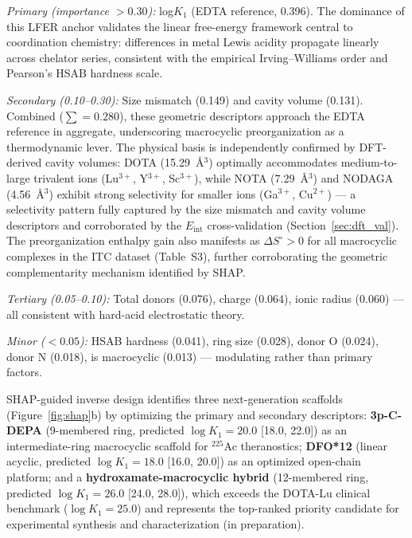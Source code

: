 \documentclass[journal=jacsat,manuscript=article]{achemso}
\begin{document}
\textit{Primary (importance $> 0.30$):} log$K_1$ (EDTA reference, 0.396).
The dominance of this LFER anchor validates the linear free-energy framework
central to coordination chemistry:\cite{Hancock1989,MartellSmith2004}
differences in metal Lewis acidity propagate linearly across chelator series,
consistent with the empirical Irving--Williams order and Pearson's HSAB
hardness scale.\cite{Pearson1963,Parr1983}

\textit{Secondary (0.10--0.30):} Size mismatch (0.149) and cavity volume (0.131).
Combined ($\sum = 0.280$), these geometric descriptors approach the EDTA
reference in aggregate, underscoring macrocyclic preorganization as a thermodynamic
lever.\cite{RocaSabio2009,Baranyai2007,Simecek2012}
The physical basis is independently confirmed by DFT-derived cavity
volumes:\cite{Kim2026molpharm} DOTA (15.29~\AA$^3$) optimally accommodates
medium-to-large trivalent ions (Lu$^{3+}$, Y$^{3+}$, Sc$^{3+}$), while NOTA
(7.29~\AA$^3$) and NODAGA (4.56~\AA$^3$) exhibit strong selectivity for
smaller ions (Ga$^{3+}$, Cu$^{2+}$) --- a selectivity pattern fully captured
by the size mismatch and cavity volume descriptors and corroborated by the
$E_\mathrm{int}$ cross-validation (Section~\ref{sec:dft_val}).
The preorganization enthalpy gain also manifests as $\Delta S^\circ > 0$ for all
macrocyclic complexes in the ITC dataset (Table~S3),\cite{Leavitt2001,Blei2023}
further corroborating the geometric complementarity mechanism identified by SHAP.

\textit{Tertiary (0.05--0.10):} Total donors (0.076), charge (0.064),
ionic radius (0.060) --- all consistent with hard-acid electrostatic theory.\cite{Hancock1989,Shannon1976}

\textit{Minor ($< 0.05$):} HSAB hardness (0.041), ring size (0.028), donor O (0.024),
donor N (0.018), is macrocyclic (0.013) --- modulating rather than primary factors.

SHAP-guided inverse design identifies three next-generation scaffolds
(Figure~\ref{fig:shap}b) by optimizing the primary and secondary descriptors:
\textbf{3p-C-DEPA} (9-membered ring, predicted $\log K_1 = 20.0$ [18.0, 22.0])
as an intermediate-ring macrocyclic scaffold for $^{225}$Ac theranostics;\cite{Thiele2017}
\textbf{DFO*12} (linear acyclic, predicted $\log K_1 = 18.0$ [16.0, 20.0])
as an optimized open-chain platform;\cite{Deri2015}
and a \textbf{hydroxamate-macrocyclic hybrid}
(12-membered ring, predicted $\log K_1 = 26.0$ [24.0, 28.0]),
which exceeds the DOTA-Lu clinical benchmark ($\log K_1 = 25.0$)\cite{deLeonRodriguez2008}
and represents the top-ranked priority candidate for experimental synthesis
and characterization (in preparation).\cite{Boros2014,Hu2022}
\end{document}
